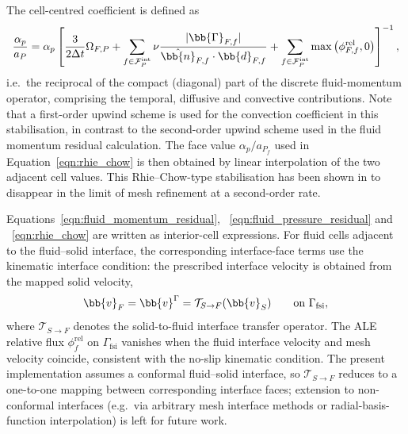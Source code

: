 The cell-centred coefficient is defined as
\begin{equation}
    \frac{\alpha_p}{a_{P}}
    =
    \alpha_p
    \left[
    \frac{3}{2\Delta t}\Omega_{F,P}
    +
    \sum_{f \in \mathcal{F}^{\mathrm{int}}_P}
    \nu
    \frac{|\bb{\Gamma}_{F,f}|}
         {\hat{\bb{n}}_{F,f} \cdot \bb{d}_{F,f}}
    +
    \sum_{f \in \mathcal{F}^{\mathrm{int}}_P}
    \max\left(\phi^{\mathrm{rel}}_{F,f},0\right)
    \right]^{-1},
    \label{qm:eqn:rAU_definition}
\end{equation}
i.e.\ the reciprocal of the compact (diagonal) part of the discrete fluid-momentum operator, comprising the temporal, diffusive and convective contributions. Note that a first-order upwind scheme is used for the convection coefficient in this stabilisation, in contrast to the second-order upwind scheme used in the fluid momentum residual calculation.
The face value $\alpha_p/a_{P_f}$ used in Equation~\eqref{eqn:rhie_chow} is then obtained by linear interpolation of the two adjacent cell values.
This Rhie--Chow-type stabilisation has been shown in \citet{Cardiff2026} to disappear in the limit of mesh refinement at a second-order rate.

Equations~\eqref{eqn:fluid_momentum_residual}, ~\eqref{eqn:fluid_pressure_residual} and ~\eqref{eqn:rhie_chow} are written as interior-cell expressions. For fluid cells adjacent to the fluid--solid interface, the corresponding interface-face terms use the kinematic interface condition: the prescribed interface velocity is obtained from the mapped solid velocity,
\begin{equation}
    \bb{v}_{F}
    =
    \bb{v}^{\Gamma}
    =
    \mathcal{T}_{S\to F}(\bb{v}_S)
    \qquad
    \text{on } \Gamma_\mathrm{fsi},
    \label{qm:eqn:mapped_solid_velocity}
\end{equation}
where $\mathcal{T}_{S\to F}$ denotes the solid-to-fluid interface transfer operator. The ALE relative flux $\phi^\mathrm{rel}_f$ on $\Gamma_\mathrm{fsi}$ vanishes when the fluid interface velocity and mesh velocity coincide, consistent with the no-slip kinematic condition. The present implementation assumes a conformal fluid--solid interface, so $\mathcal{T}_{S\to F}$ reduces to a one-to-one mapping between corresponding interface faces; extension to non-conformal interfaces (e.g.\ via arbitrary mesh interface methods or radial-basis-function interpolation) is left for future work.


